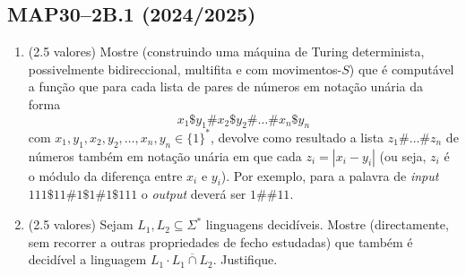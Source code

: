 \documentclass[a4paper,12pt]{article}
\begin{document}
\vspace{1.0cm}
\subsection*{MAP30–2B.1 (2024/2025)}
\begin{enumerate}[label=\alph*)]
  \item (2.5 valores) Mostre (construindo uma máquina de Turing determinista, possivelmente bidireccional, multifita e com movimentos-\(S\)) que é computável a função que para cada lista de pares de números em notação unária da forma
  \[x_1 \$ y_1 \# x_2 \$ y_2 \# \ldots \# x_n \$ y_n\]
  com \(x_1, y_1, x_2, y_2, \ldots, x_n, y_n \in \{1\}^*\), devolve como resultado a lista \(z_1 \# \ldots \# z_n\) de números também em notação unária em que cada \(z_i = |x_i - y_i|\) (ou seja, \(z_i\) é o módulo da diferença entre \(x_i\) e \(y_i\)).  
  Por exemplo, para a palavra de \textit{input} \(111\$11\#1\$1\#1\$111\) o \textit{output} deverá ser \(1\#\#11\).

  \item (2.5 valores) Sejam \(L_1, L_2 \subseteq \Sigma^*\) linguagens decidíveis. Mostre (directamente, sem recorrer a outras propriedades de fecho estudadas) que também é decidível a linguagem $L_1 \cdot \overline{L_1 \cap L_2}$. Justifique.
\end{enumerate}
\end{document}
